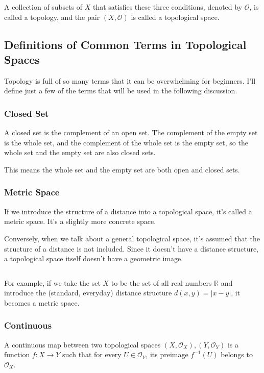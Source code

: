 \documentclass{article}
\begin{document}
A collection of subsets of $X$ that satisfies these three conditions, denoted by $\mathcal{O}$, is called a topology, and the pair $(X, {\mathcal O})$ is called a topological space.

\subsection{Definitions of Common Terms in Topological Spaces}

Topology is full of so many terms that it can be overwhelming for beginners. I'll define just a few of the terms that will be used in the following discussion.

\subsubsection{Closed Set}

A closed set is the complement of an open set.
The complement of the empty set is the whole set, and the complement of the whole set is the empty set, so the whole set and the empty set are also closed sets.

This means the whole set and the empty set are both open and closed sets.


\subsubsection{Metric Space}

If we introduce the structure of a distance into a topological space, it's called a metric space. It's a slightly more concrete space.

Conversely, when we talk about a general topological space, it's assumed that the structure of a distance is not included.
Since it doesn't have a distance structure, a topological space itself doesn't have a geometric image.

${}$

For example, if we take the set $X$ to be the set of all real numbers $\mathbb{R}$ and introduce the (standard, everyday) distance structure $d(x,y) = |x-y|$, it becomes a metric space.

\subsubsection{Continuous}

A continuous map between two topological spaces $(X, {\mathcal O}_{X}), (Y, {\mathcal O}_{Y})$ is a function
$f: X \to Y$ such that for every $U \in {\mathcal O}_{Y}$, its preimage
$f^{-1}(U)$ belongs to ${\mathcal O}_{X}$.
\end{document}
